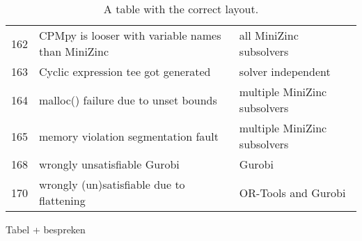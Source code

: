 \begin{table}[]
\begin{tabular}{lll}
		162   & CPMpy is looser with variable names than MiniZinc         & all MiniZinc subsolvers                        \\
		163   & Cyclic expression tee got generated                       & solver independent                             \\
		164   & malloc() failure due to unset bounds                      & multiple MiniZinc subsolvers                   \\
		165   & memory violation segmentation fault                       & multiple MiniZinc subsolvers                   \\
		168   & wrongly unsatisfiable Gurobi                              & Gurobi                                         \\
		170   & wrongly (un)satisfiable due to flattening                 & OR-Tools and Gurobi                            \\ \bottomrule
	\end{tabular}
	\caption{A table with the correct layout.}
	\label{tab:bug:Solver}
\end{table}

Tabel + bespreken
